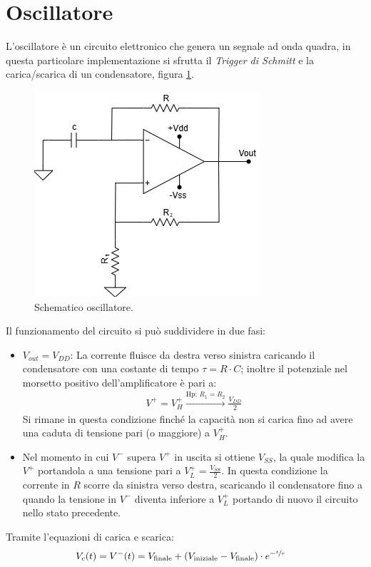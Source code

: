\documentclass[a4paper,12pt]{article}
\begin{document}
\section*{Oscillatore}
L'oscillatore è un circuito elettronico che genera un segnale ad onda quadra, in questa particolare implementazione si sfrutta il \textit{Trigger di Schmitt} e la carica/scarica di un condensatore, figura \ref{fig:schematico_oscillatore}.
\begin{figure}
	\centering
	\includegraphics[width=0.5\linewidth]{immagini/oscillatore/circuito.png}
	\caption{Schematico oscillatore.}
	\label{fig:schematico_oscillatore}
\end{figure}
Il funzionamento del circuito si può suddividere in due fasi:
\begin{itemize}
	\item $V_{out} = V_{DD}$: La corrente fluisce da destra verso sinistra caricando il condensatore con una costante di tempo $\tau = R \cdot C$; inoltre il potenziale nel morsetto positivo dell'amplificatore è pari a:
	      \begin{align*}
		      V^+ = V^+_H \xrightarrow{\mathrm{Hp:}\,R_1 = R_2} \frac{V_{DD}}{2}
	      \end{align*}
	      Si rimane in questa condizione finché la capacità non si carica fino ad avere una caduta di tensione pari (o maggiore) a $V^+_H$.
	\item Nel momento in cui $V^-$ supera $V^+$ in uscita si ottiene $V_{SS}$, la quale modifica la $V^+$ portandola a una tensione pari a $V^+_L = \frac{V_{SS}}{2}$. In questa condizione la corrente in $R$ scorre da sinistra verso destra, scaricando il condensatore fino a quando la tensione in $V^-$ diventa inferiore a $V^+_L$ portando di nuovo il circuito nello stato precedente.
\end{itemize}
Tramite l'equazioni di carica e scarica:
\begin{align*}
	V_c (t) = V^- (t) & = V_{\text{finale}} + (V_{\text{iniziale}} - V_{\text{finale}} ) \cdot e^{-\sfrac{t}{\tau}}
\end{align*}
\end{document}
